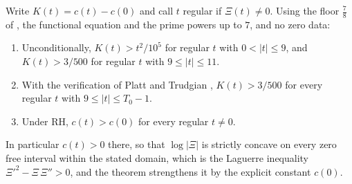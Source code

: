 \begin{theorem}\label{qt:thm:curv}
Write $K(t)=c(t)-c(0)$ and call $t$ regular if $\Xi(t)\ne0$. Using the floor $\tfrac78$ of \cite{OAI26a}, the functional equation and the prime powers up to $7$, and no zero data:
\begin{enumerate}
\item Unconditionally, $K(t)>t^2/10^5$ for regular $t$ with $0<|t|\le9$, and $K(t)>3/500$ for regular $t$ with $9\le|t|\le11$.
\item With the verification of Platt and Trudgian \cite{PT21}, $K(t)>3/500$ for every regular $t$ with $9\le|t|\le T_0-1$.
\item Under RH, $c(t)>c(0)$ for every regular $t\ne0$.
\end{enumerate}
In particular $c(t)>0$ there, so that $\log|\Xi|$ is strictly concave on every zero free interval within the stated domain, which is the Laguerre inequality $\Xi'^2-\Xi\,\Xi''>0$, and the theorem strengthens it by the explicit constant $c(0)$.
\end{theorem}

